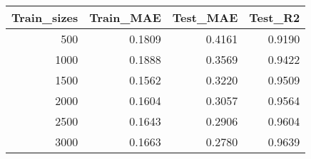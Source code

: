 \begin{tabular}{rrrr}
\toprule
Train_sizes & Train_MAE & Test_MAE & Test_R2 \\
\midrule
500 & 0.1809 & 0.4161 & 0.9190 \\
1000 & 0.1888 & 0.3569 & 0.9422 \\
1500 & 0.1562 & 0.3220 & 0.9509 \\
2000 & 0.1604 & 0.3057 & 0.9564 \\
2500 & 0.1643 & 0.2906 & 0.9604 \\
3000 & 0.1663 & 0.2780 & 0.9639 \\
\bottomrule
\end{tabular}
